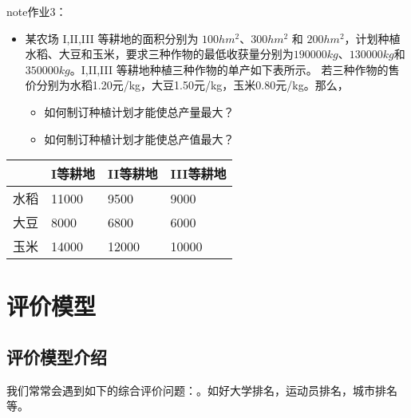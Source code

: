 \documentclass[letterpaper,10pt,english]{sphinxmanual}
\begin{document}
\begin{sphinxadmonition}{note}{作业3：}
\begin{itemize}
\item {} 
某农场 I,II,III 等耕地的面积分别为 \(100 hm^2\)、\(300 hm^2\) 和 \(200 hm^2\)，计划种植水稻、大豆和玉米，要求三种作物的最低收获量分别为\(190000kg\)、\(130000kg\)和\(350000kg\)。I,II,III 等耕地种植三种作物的单产如下表所示。
若三种作物的售价分别为水稻1.20元/kg，大豆1.50元/kg，玉米0.80元/kg。那么，
\begin{itemize}
\item {} 
如何制订种植计划才能使总产量最大？

\item {} 
如何制订种植计划才能使总产值最大？

\end{itemize}

\end{itemize}


\begin{savenotes}\sphinxattablestart
\centering
\begin{tabulary}{\linewidth}[t]{|T|T|T|T|}
\hline


&\sphinxstyletheadfamily 
I等耕地
&\sphinxstyletheadfamily 
II等耕地
&\sphinxstyletheadfamily 
III等耕地
\\
\hline
水稻
&
11000
&
9500
&
9000
\\
\hline
大豆
&
8000
&
6800
&
6000
\\
\hline
玉米
&
14000
&
12000
&
10000
\\
\hline
\end{tabulary}
\par
\sphinxattableend\end{savenotes}
\end{sphinxadmonition}


\chapter{评价模型}
\label{\detokenize{docs/evaluation_model:id1}}\label{\detokenize{docs/evaluation_model::doc}}

\section{评价模型介绍}
\label{\detokenize{docs/evaluation_model:id2}}
我们常常会遇到如下的综合评价问题：。如好大学排名，运动员排名，城市排名等。
\end{document}
